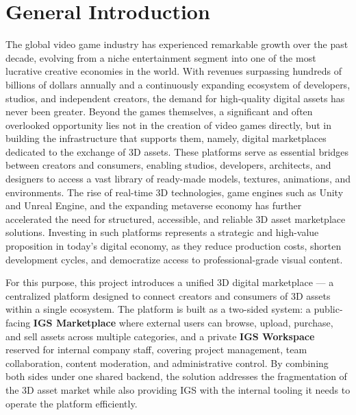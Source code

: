 \chapter*{General Introduction}

The global video game industry has experienced remarkable growth over the past decade, evolving from a niche entertainment segment into one of the most lucrative creative economies in the world. With revenues surpassing hundreds of billions of dollars annually and a continuously expanding ecosystem of developers, studios, and independent creators, the demand for high-quality digital assets has never been greater. Beyond the games themselves, a significant and often overlooked opportunity lies not in the creation of video games directly, but in building the infrastructure that supports them, namely, digital marketplaces dedicated to the exchange of 3D assets. These platforms serve as essential bridges between creators and consumers, enabling studios, developers, architects, and designers to access a vast library of ready-made models, textures, animations, and environments. The rise of real-time 3D technologies, game engines such as Unity and Unreal Engine, and the expanding metaverse economy has further accelerated the need for structured, accessible, and reliable 3D asset marketplace solutions. Investing in such platforms represents a strategic and high-value proposition in today's digital economy, as they reduce production costs, shorten development cycles, and democratize access to professional-grade visual content.

For this purpose, this project introduces a unified 3D digital marketplace — a centralized platform designed to connect creators and consumers of 3D assets within a single ecosystem. The platform is built as a two-sided system: a public-facing \textbf{IGS Marketplace} where external users can browse, upload, purchase, and sell assets across multiple categories, and a private \textbf{IGS Workspace} reserved for internal company staff, covering project management, team collaboration, content moderation, and administrative control. By combining both sides under one shared backend, the solution addresses the fragmentation of the 3D asset market while also providing IGS with the internal tooling it needs to operate the platform efficiently.

